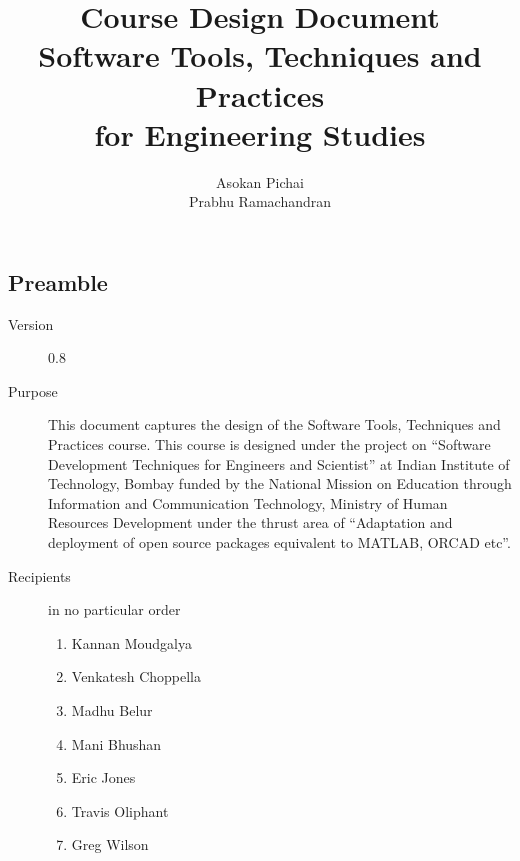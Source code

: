 \documentclass{article}
\title{Course Design Document\\Software Tools, Techniques and Practices\\for Engineering Studies}
\author{Asokan Pichai\\Prabhu Ramachandran}
\date{}
\begin{document}
\maketitle

\subsection{Preamble} 
\begin{description}
  \item[Version] 0.8
  \item[Purpose] This document captures the design of the Software
      Tools, Techniques and Practices course. This course is designed
      under the project on ``Software Development Techniques for Engineers and Scientist''
      at Indian Institute of Technology,
      Bombay funded by the National Mission on Education through
      Information and Communication Technology, Ministry of Human
      Resources Development under the thrust area of ``Adaptation and
      deployment of open source packages equivalent to MATLAB, ORCAD etc''.

  \item[Recipients] in no particular order
  \begin{enumerate}
     \item Kannan Moudgalya
     \item Venkatesh Choppella
     \item Madhu Belur
     \item Mani Bhushan
     \item Eric Jones
     \item Travis Oliphant
     \item Greg Wilson
  \end{enumerate}
\end{description}
\newpage
\end{document}
